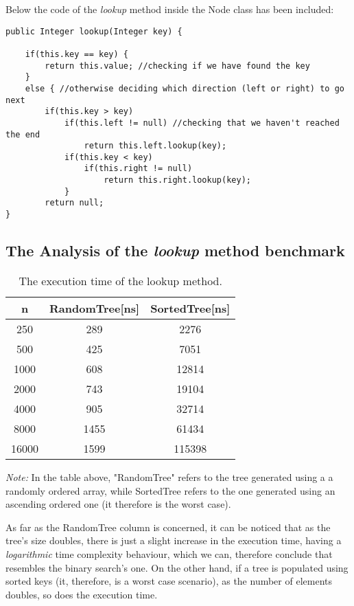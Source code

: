 \documentclass[a4paper,11pt]{article}
\begin{document}
Below the code of the \textit{lookup} method inside the Node class has been included:\newline
\begin{verbatim}
public Integer lookup(Integer key) {
            
    if(this.key == key) {
        return this.value; //checking if we have found the key
    }
    else { //otherwise deciding which direction (left or right) to go next 
        if(this.key > key)
            if(this.left != null) //checking that we haven't reached the end
                return this.left.lookup(key);
            if(this.key < key)
                if(this.right != null)
                    return this.right.lookup(key);    
            }
        return null;
}
\end{verbatim}

\subsection*{The Analysis of the \textit{lookup} method benchmark}

\begin{table}[h!]
    \centering
    \begin{tabular}{||c c c||} 
    \hline\hline
    n & RandomTree[ns] & SortedTree[ns] \\ [0.5ex]
    \hline
    250 & 289 & 2276\\
    500 & 425 & 7051 \\
    1000 & 608 & 12814 \\ 
    2000 & 743 & 19104 \\ 
    4000 & 905 & 32714 \\ 
    8000 & 1455 & 61434 \\ 
    16000 & 1599 & 115398 \\ [1ex] 
    \hline
    \end{tabular}
    \caption{The execution time of the lookup method.} 
    \label{table:1}
\end{table}

\textit{Note: } In the table above, "RandomTree" refers to the tree generated using a a randomly ordered array, while SortedTree refers to the one generated using an ascending ordered one (it therefore is the worst case).\newline

As far as the RandomTree column is concerned, it can be noticed that as the tree's size doubles, there is just a slight increase in the execution time, having a \textit{logarithmic} time complexity behaviour, which we can, therefore conclude that resembles the binary search's one. On the other hand, if a tree is populated using sorted keys (it, therefore, is a worst case scenario), as the number of elements doubles, so does the execution time.  
\end{document}
